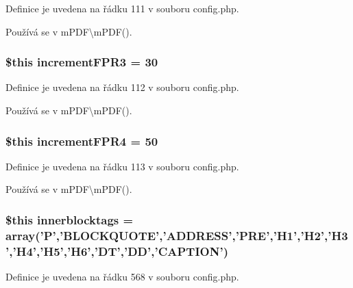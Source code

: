 Definice je uvedena na řádku 111 v souboru config.\-php.



Používá se v m\-P\-D\-F\textbackslash{}m\-P\-D\-F().

\hypertarget{config_8php_ad740a5db9735ccb22f53324dbfe121fb}{
\subsubsection[{increment\-F\-P\-R3}]{\setlength{\rightskip}{0pt plus 5cm}\$this increment\-F\-P\-R3 = 30}}\label{config_8php_ad740a5db9735ccb22f53324dbfe121fb}


Definice je uvedena na řádku 112 v souboru config.\-php.



Používá se v m\-P\-D\-F\textbackslash{}m\-P\-D\-F().

\hypertarget{config_8php_a732a97aab2478ad0cd6bfac82d99e785}{
\subsubsection[{increment\-F\-P\-R4}]{\setlength{\rightskip}{0pt plus 5cm}\$this increment\-F\-P\-R4 = 50}}\label{config_8php_a732a97aab2478ad0cd6bfac82d99e785}


Definice je uvedena na řádku 113 v souboru config.\-php.



Používá se v m\-P\-D\-F\textbackslash{}m\-P\-D\-F().

\hypertarget{config_8php_ad02a87c52cbc668e95248ad4f473bca8}{
\subsubsection[{innerblocktags}]{\setlength{\rightskip}{0pt plus 5cm}\$this innerblocktags = array('P','B\-L\-O\-C\-K\-Q\-U\-O\-T\-E','A\-D\-D\-R\-E\-S\-S','P\-R\-E','H1','H2','H3','H4','H5','H6','D\-T','D\-D','C\-A\-P\-T\-I\-O\-N')}}\label{config_8php_ad02a87c52cbc668e95248ad4f473bca8}


Definice je uvedena na řádku 568 v souboru config.\-php.




